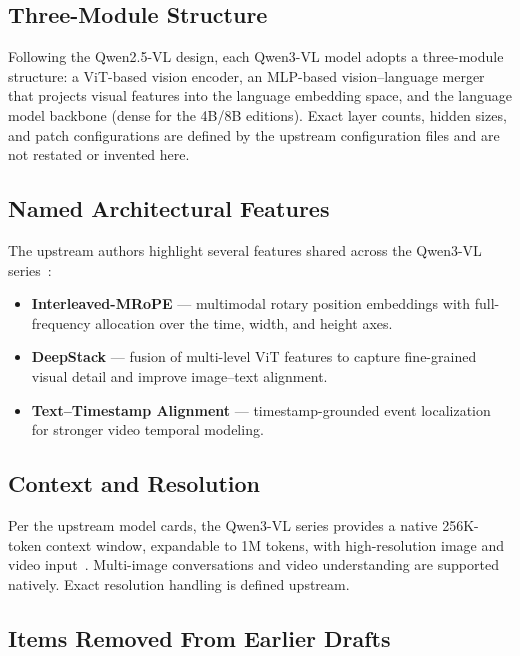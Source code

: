 \documentclass[11pt,a4paper]{article}
\begin{document}
\subsection{Three-Module Structure}

Following the Qwen2.5-VL design, each Qwen3-VL model adopts a three-module structure: a
ViT-based vision encoder, an MLP-based vision--language merger that projects visual features
into the language embedding space, and the language model backbone (dense for the 4B/8B
editions). Exact layer counts, hidden sizes, and patch configurations are defined by the
upstream configuration files and are not restated or invented here.

\subsection{Named Architectural Features}

The upstream authors highlight several features shared across the Qwen3-VL
series~\cite{qwen3vl4b}:

\begin{itemize}
  \item \textbf{Interleaved-MRoPE} --- multimodal rotary position embeddings with
        full-frequency allocation over the time, width, and height axes.
  \item \textbf{DeepStack} --- fusion of multi-level ViT features to capture fine-grained
        visual detail and improve image--text alignment.
  \item \textbf{Text--Timestamp Alignment} --- timestamp-grounded event localization for
        stronger video temporal modeling.
\end{itemize}

\subsection{Context and Resolution}

Per the upstream model cards, the Qwen3-VL series provides a native 256K-token context
window, expandable to 1M tokens, with high-resolution image and video
input~\cite{qwen3vl4b}. Multi-image conversations and video understanding are supported
natively. Exact resolution handling is defined upstream.

\subsection{Items Removed From Earlier Drafts}
\end{document}
